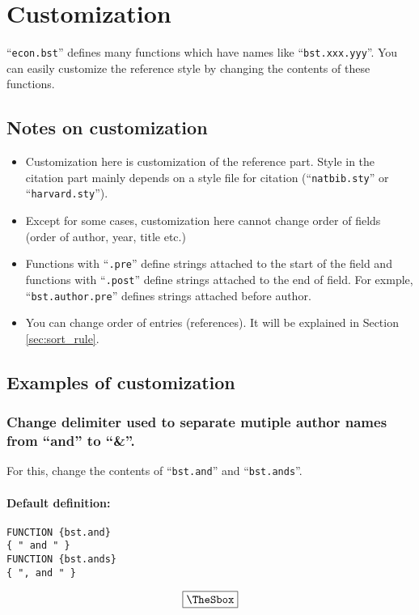 \documentclass[10pt]{article}
\newenvironment{Frame}%
{\setlength{\fboxsep}{15pt}
\setlength{\mylength}{\linewidth}%
\addtolength{\mylength}{-2\fboxsep}%
\addtolength{\mylength}{-2\fboxrule}%
\Sbox
\minipage{\mylength}%
\setlength{\abovedisplayskip}{0pt}%
\setlength{\belowdisplayskip}{0pt}%
}%
{\endminipage\endSbox
\[\fbox{\TheSbox}\]}
\begin{document}
\section{Customization}

``\texttt{econ.bst}'' defines many functions which have names like
``\texttt{bst.xxx.yyy}''.  You can easily customize the reference style by
changing the contents of these functions.

\subsection{Notes on customization}

\begin{itemize}
 \item Customization here is customization of the reference part.  Style
       in the citation part mainly depends on a style file for citation
       (``\texttt{natbib.sty}'' or ``\texttt{harvard.sty}'').
 \item Except for some cases, customization here cannot change order
       of fields (order of author, year, title etc.)
 \item Functions with ``\texttt{.pre}'' define strings attached to the start
       of the field and functions with ``\texttt{.post}'' define strings
       attached to the end of field.  For exmple,
       ``\texttt{bst.author.pre}'' defines strings attached before author.
 \item You can change order of entries (references).  It will be
       explained in Section \ref{sec:sort_rule}.
\end{itemize}

\subsection{Examples of customization}

\subsubsection{Change delimiter used to separate mutiple author names
   from ``and'' to ``\&''.}

For this, change the contents of ``\texttt{bst.and}'' and ``\texttt{bst.ands}''.
\paragraph{Default definition:}
\begin{Frame}
\begin{verbatim}
FUNCTION {bst.and}
{ " and " }
FUNCTION {bst.ands}
{ ", and " }
\end{verbatim}
\end{Frame}
\end{document}

